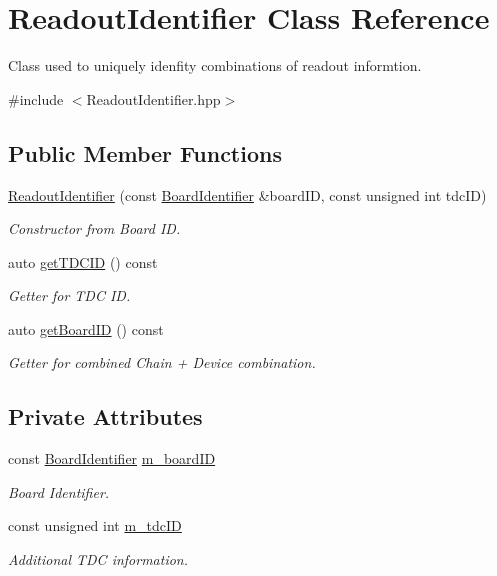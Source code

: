 \hypertarget{class_readout_identifier}{}\section{Readout\+Identifier Class Reference}
\label{class_readout_identifier}


Class used to uniquely idenfity combinations of readout informtion.  




{\ttfamily \#include $<$Readout\+Identifier.\+hpp$>$}

\subsection*{Public Member Functions}
\begin{DoxyCompactItemize}
\item 
\hyperlink{class_readout_identifier_a6dbfa3a186abade180d962aa22c81e71}{Readout\+Identifier} (const \hyperlink{class_board_identifier}{Board\+Identifier} \&board\+ID, const unsigned int tdc\+ID)
\begin{DoxyCompactList}\small\item\em Constructor from Board ID. \end{DoxyCompactList}\item 
auto \hyperlink{class_readout_identifier_a17ec929ed43ac36bf7913ba2ad316f2f}{get\+T\+D\+C\+ID} () const
\begin{DoxyCompactList}\small\item\em Getter for T\+DC ID. \end{DoxyCompactList}\item 
auto \hyperlink{class_readout_identifier_ad5a9727c8ed4bd02883f6d68d0fadac8}{get\+Board\+ID} () const
\begin{DoxyCompactList}\small\item\em Getter for combined Chain + Device combination. \end{DoxyCompactList}\end{DoxyCompactItemize}
\subsection*{Private Attributes}
\begin{DoxyCompactItemize}
\item 
const \hyperlink{class_board_identifier}{Board\+Identifier} \hyperlink{class_readout_identifier_ae866229661d1f335f0ef20e382020070}{m\+\_\+board\+ID}
\begin{DoxyCompactList}\small\item\em Board Identifier. \end{DoxyCompactList}\item 
const unsigned int \hyperlink{class_readout_identifier_a51c3175e53d5178fe8bba193c04052c4}{m\+\_\+tdc\+ID}
\begin{DoxyCompactList}\small\item\em Additional T\+DC information. \end{DoxyCompactList}\end{DoxyCompactItemize}
